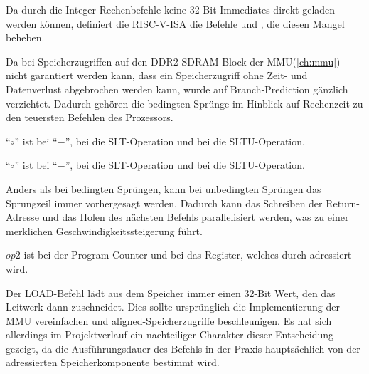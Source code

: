 
Da durch die Integer Rechenbefehle keine 32-Bit Immediates direkt geladen werden
k\"onnen, definiert die RISC-V-ISA die Befehle  und , die
diesen Mangel beheben.



Da bei Speicherzugriffen auf den DDR2-SDRAM Block der MMU(\ref{ch:mmu}) nicht
garantiert werden kann, dass ein Speicherzugriff ohne Zeit- und Datenverlust
abgebrochen werden kann, wurde auf Branch-Prediction g\"anzlich verzichtet.
Dadurch geh\"oren die bedingten Spr\"unge im Hinblick auf Rechenzeit zu den
teuersten Befehlen des Prozessors.

{``\(\circ\)'' ist bei  ``\(-\)'', bei  die SLT-Operation
und bei  die SLTU-Operation.
}

{``\(\circ\)'' ist bei  ``\(-\)'', bei  die SLT-Operation
und bei  die SLTU-Operation.
}

Anders als bei bedingten Spr\"ungen, kann bei unbedingten Spr\"ungen das
Sprungzeil immer vorhergesagt werden. Dadurch kann das Schreiben der
Return-Adresse und das Holen des n\"achsten Befehls parallelisiert werden, was
zu einer merklichen Geschwindigkeitssteigerung f\"uhrt.

{\(op2\) ist bei  der Program-Counter und bei  das
Register, welches durch  adressiert wird.
}

Der LOAD-Befehl l\"adt aus dem Speicher immer einen 32-Bit Wert, den das
Leitwerk dann zuschneidet. Dies sollte urspr\"unglich die Implementierung der
MMU vereinfachen und aligned-Speicherzugriffe beschleunigen. Es hat sich
allerdings im Projektverlauf ein nachteiliger Charakter dieser Entscheidung gezeigt, da die Ausf\"uhrungsdauer des Befehls in der Praxis
haupts\"achlich von der adressierten Speicherkomponente bestimmt wird.

